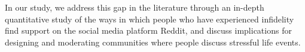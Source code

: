 


In our study, we address this gap in the literature through an in-depth quantitative study of the ways in which people who have experienced infidelity find support on the social media platform Reddit, and discuss implications for designing and moderating communities where people discuss stressful life events. 

